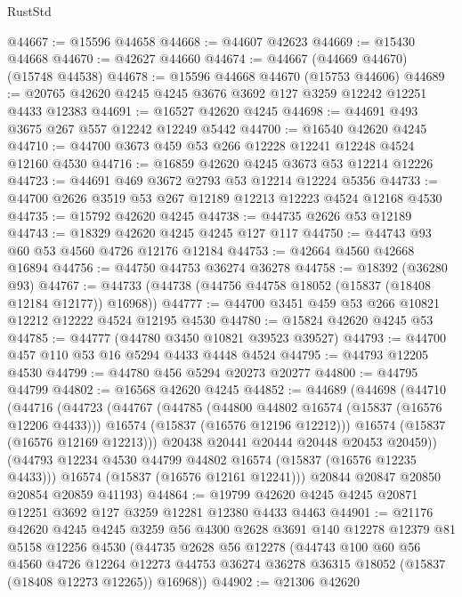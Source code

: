 \begin{lexlean}{RustStd}
\begin{coremodule}
{\begin{coremodule}
{{{{{{{{{{{{{{{{{{{{{{{{{{{{{{{{{{{{{{{{{{{{{{{{{{{{{{{{{{{{@44667 := @15596 @44658
@44668 := @44607 @42623
@44669 := @15430 @44668
@44670 := @42627 @44660
@44674 := @44667 (@44669 @44670) (@15748 @44538)
@44678 := @15596 @44668 @44670 (@15753 @44606)
@44689 := @20765 @42620 @4245 @4245 @3676 @3692 @127 @3259 @12242 @12251 @4433 @12383
@44691 := @16527 @42620 @4245
@44698 := @44691 @493 @3675 @267 @557 @12242 @12249 @5442
@44700 := @16540 @42620 @4245
@44710 := @44700 @3673 @459 @53 @266 @12228 @12241 @12248 @4524 @12160 @4530
@44716 := @16859 @42620 @4245 @3673 @53 @12214 @12226
@44723 := @44691 @469 @3672 @2793 @53 @12214 @12224 @5356
@44733 := @44700 @2626 @3519 @53 @267 @12189 @12213 @12223 @4524 @12168 @4530
@44735 := @15792 @42620 @4245
@44738 := @44735 @2626 @53 @12189
@44743 := @18329 @42620 @4245 @4245 @127 @117
@44750 := @44743 @93 @60 @53 @4560 @4726 @12176 @12184
@44753 := @42664 @4560 @42668 @16894
@44756 := @44750 @44753 @36274 @36278
@44758 := @18392 (@36280 @93)
@44767 := @44733 (@44738 (@44756 @44758 @18052 (@15837 (@18408 @12184 @12177)) @16968))
@44777 := @44700 @3451 @459 @53 @266 @10821 @12212 @12222 @4524 @12195 @4530
@44780 := @15824 @42620 @4245 @53
@44785 := @44777 (@44780 @3450 @10821 @39523 @39527)
@44793 := @44700 @457 @110 @53 @16 @5294 @4433 @4448 @4524
@44795 := @44793 @12205 @4530
@44799 := @44780 @456 @5294 @20273 @20277
@44800 := @44795 @44799
@44802 := @16568 @42620 @4245
@44852 := @44689
    (@44698
      (@44710
        (@44716
          (@44723
            (@44767
              (@44785
                (@44800 @44802 @16574 (@15837 (@16576 @12206 @4433)))
                @16574
                (@15837 (@16576 @12196 @12212)))
              @16574
              (@15837 (@16576 @12169 @12213)))
            @20438
            @20441
            @20444
            @20448
            @20453
            @20459))
        (@44793 @12234 @4530 @44799 @44802 @16574 (@15837 (@16576 @12235 @4433)))
        @16574
        (@15837 (@16576 @12161 @12241)))
      @20844
      @20847
      @20850
      @20854
      @20859
      @41193)
@44864 := @19799 @42620 @4245 @4245 @20871 @12251 @3692 @127 @3259 @12281 @12380 @4433 @4463
@44901 := @21176
    @42620
    @4245
    @4245
    @3259
    @56
    @4300
    @2628
    @3691
    @140
    @12278
    @12379
    @81
    @5158
    @12256
    @4530
    (@44735
      @2628
      @56
      @12278
      (@44743
        @100
        @60
        @56
        @4560
        @4726
        @12264
        @12273
        @44753
        @36274
        @36278
        @36315
        @18052
        (@15837 (@18408 @12273 @12265))
        @16968))
@44902 := @21306 @42620
}}}}}}}}}}}}}}}}}}}}}}}}}}}}}}}}}}}}}}}}}}}}}}}}}}}}}}}}}}}}
\end{coremodule}}
\end{coremodule}
\end{lexlean}
